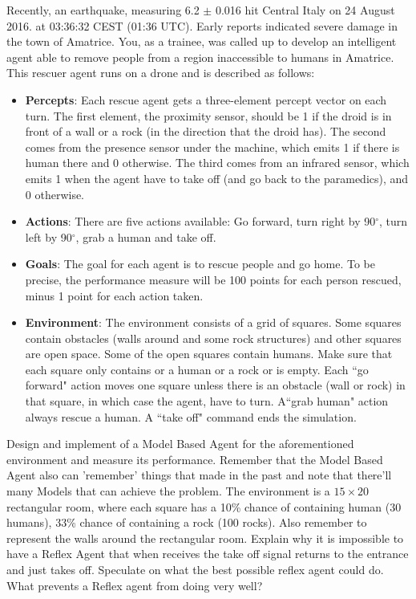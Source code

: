 \documentclass[11pt]{article}
\newenvironment{EX}[2][Exercise]{\begin{trivlist}
\item[{\color{red} \hskip \labelsep {\bfseries #1}\hskip \labelsep {\bfseries #2.}}]}{\end{trivlist}}
\begin{document}
\begin{EX}{01.05}
Recently, an earthquake, measuring 6.2 $\pm$ 0.016 hit Central Italy on 24 August 2016. at 03:36:32 CEST (01:36 UTC). Early reports indicated severe damage in the town of Amatrice. You, as a trainee, was called up to develop an intelligent agent able to remove people from a region inaccessible to humans in Amatrice. This rescuer agent runs on a drone and is described as follows:

\begin{itemize}
\item {\bf  Percepts}: Each rescue agent gets a three-element percept vector on each turn. The first element, the proximity sensor, should be 1 if the droid is in front of a wall or a rock (in the direction that the droid has). The second comes from the presence sensor under the machine, which emits 1 if there is human there and 0 otherwise. The third comes from an infrared sensor, which emits 1 when the agent have to take off (and go back to the paramedics), and 0 otherwise.

\item {\bf Actions}: There are five actions available: Go forward, turn right by 90$^{\circ}$, turn left by 90$^{\circ}$, grab a human and take off.

\item {\bf Goals}: The goal for each agent is to rescue people  and go home. To be precise, the performance measure will be 100 points for each person rescued, minus 1 point for each action taken.

\item {\bf Environment}: The environment consists of a grid of squares. Some squares contain obstacles (walls around and some rock structures) and other squares are open space. Some of the open squares contain humans. Make sure that each square only contains or a human or a rock or is empty. Each ``go forward" action moves one square unless there is an obstacle (wall or rock) in that square, in which case the agent, have to turn. A``grab human" action always rescue a human. A ``take off" command ends the simulation.

\end{itemize}


Design and implement of a Model Based Agent for the aforementioned environment and measure its performance. Remember that the Model Based Agent also can 'remember' things that made in the past and note that there'll many Models that can achieve the problem. The environment is a  $15 \times 20$ rectangular room, where each square has a 10\% chance of containing human (30 humans), 33\% chance of containing a rock (100 rocks). Also remember to represent the walls around the rectangular room.
Explain why it is impossible to have a Reflex Agent that when receives the take off signal returns to the entrance and just takes off. Speculate on what the best possible reflex agent could do. What prevents a Reflex agent from doing very well?
\end{EX}
\end{document}
